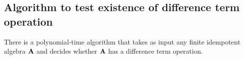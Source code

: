 \subsection{Algorithm to test existence of difference term operation}
\label{sec:algor-1}
\begin{corollary}
  \label{cor:algor-1}
  There is a polynomial-time algorithm that takes as input
  any finite idempotent algebra $\mathbf{A} $ and decides whether
  $\mathbf{A} $ has a difference term operation.
\end{corollary}
